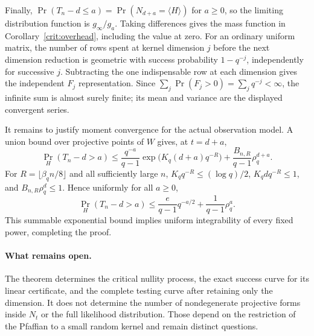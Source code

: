 Finally, $\Pr(T_n-d\le a)=\Pr(N_{d+a}=\langle H\rangle)$ for $a\ge0$,
so the limiting distribution function is $g_\infty/g_a$.
Taking differences gives the mass function in
Corollary~\ref{crit:overhead}, including the value at zero.
For an ordinary uniform matrix, the number of rows spent at kernel
dimension $j$ before the next dimension reduction is geometric with
success probability $1-q^{-j}$, independently for successive $j$.
Subtracting the one indispensable row at each dimension gives the
independent $F_j$ representation. Since
$\sum_j\Pr(F_j>0)=\sum_jq^{-j}<\infty$, the infinite sum is almost
surely finite; its mean and variance are the displayed convergent
series.

It remains to justify moment convergence for the actual observation
model. A union bound over projective points of $W$ gives, at $t=d+a$,
\[
 \Pr_H(T_n-d>a)
 \le\frac{q^{-a}}{q-1}\exp\bigl(K_q(d+a)q^{-R}\bigr)
   +\frac{B_{n,R}}{q-1}\rho_q^{d+a}.
\]
For $R=\lfloor\beta_qn/8\rfloor$ and all sufficiently large $n$,
$K_qq^{-R}\le(\log q)/2$, $K_qdq^{-R}\le1$, and
$B_{n,R}\rho_q^d\le1$. Hence uniformly for all $a\ge0$,
\[
 \Pr_H(T_n-d>a)
 \le\frac{e}{q-1}q^{-a/2}+\frac1{q-1}\rho_q^a.
\]
This summable exponential bound implies uniform integrability of every
fixed power, completing the proof.

\paragraph{What remains open.}
The theorem determines the critical nullity process, the exact success
curve for its linear certificate, and the complete testing curve after
retaining only the dimension. It does not determine the number of
nondegenerate projective forms inside $N_t$ or the full likelihood
distribution. Those depend on the restriction of the Pfaffian to a
small random kernel and remain distinct questions.
